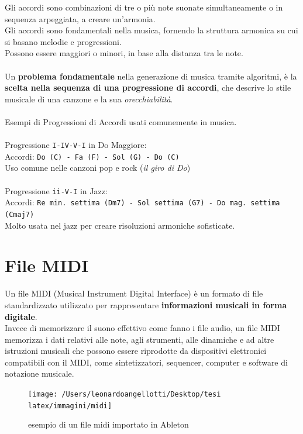 \documentclass[a4paper,12pt]{report}
\begin{document}
Gli accordi sono combinazioni di tre o più note suonate simultaneamente o in sequenza arpeggiata, a creare un'armonia. \\
Gli accordi sono fondamentali nella musica, fornendo la struttura armonica su cui si basano melodie e progressioni. \\
Possono essere maggiori o minori, in base alla distanza tra le note. \\
\\
Un \textbf{problema fondamentale} nella generazione di musica tramite algoritmi, è la \textbf{scelta nella sequenza di una progressione di accordi}, che descrive lo stile musicale di una canzone e la sua \textit{orecchiabilità}. \\
\\
Esempi di Progressioni di Accordi usati comunemente in musica.\\
\\
Progressione \texttt{I-IV-V-I} in Do Maggiore: \\
Accordi: \texttt{Do (C) - Fa (F) - Sol (G) - Do (C)} \\
Uso comune nelle canzoni pop e rock (\textit{il giro di Do}) \\
\\
Progressione \texttt{ii-V-I} in Jazz: \\
Accordi: \texttt{Re min. settima (Dm7) - Sol settima (G7) - Do mag. settima (Cmaj7)} \\
Molto usata nel jazz per creare risoluzioni armoniche sofisticate.

\section{File MIDI}

Un file MIDI (Musical Instrument Digital Interface) è un formato di file standardizzato utilizzato per rappresentare \textbf{informazioni musicali in forma digitale}. \\
Invece di memorizzare il suono effettivo come fanno i file audio, un file MIDI memorizza i dati relativi alle note, agli strumenti, alle dinamiche e ad altre istruzioni musicali che possono essere riprodotte da dispositivi elettronici compatibili con il MIDI, come sintetizzatori, sequencer, computer e software di notazione musicale.

\begin{figure}[H]
    \centering
    \texttt{[image: /Users/leonardoangellotti/Desktop/tesi latex/immagini/midi]} 
    \caption{esempio di un file midi importato in Ableton}
    \label{fig:immagine}
\end{figure}
\end{document}
